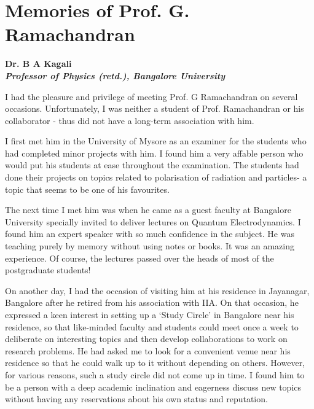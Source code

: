 \chapter{Memories of Prof. G. Ramachandran}\label{chap7}


\begin{center}
\textbf{Dr. B A Kagali}\\
\textbf{\textit{Professor of Physics (retd.), Bangalore University}}
\end{center}

I had the pleasure and privilege of meeting Prof. G Ramachandran on several occasions. Unfortunately, I was neither a student of Prof. Ramachandran or his collaborator - thus did not have a long-term association with him.

\medskip

I first met him in the University of Mysore as an examiner for the students who had completed minor projects with him. I found him a very affable person who would put his students at ease throughout the examination. The students had done their projects on topics related to polarisation of radiation and particles- a topic that seems to be one of his favourites.

\medskip

The next time I met him was when he came as a guest faculty at Bangalore University specially invited to deliver lectures on Quantum Electrodynamics. I found him an expert speaker with so much confidence in the subject. He was teaching purely by memory without using notes or books. It was an amazing experience. Of course, the lectures passed over the heads of most of the postgraduate students!

\medskip

On another day, I had the occasion of visiting him at his residence in Jayanagar, Bangalore after he retired from his association with IIA. On that occasion, he expressed a keen interest in setting up a `Study Circle' in Bangalore near his residence, so that like-minded faculty and students could meet once a week to deliberate on interesting topics and then develop collaborations to work on research problems. He had asked me to look for a convenient venue near his residence so that he could walk up to it without depending on others. However, for various reasons, such a study circle did not come up in time. I found him to be a person with a deep academic inclination and eagerness discuss new topics without having any reservations about his own status and reputation.

